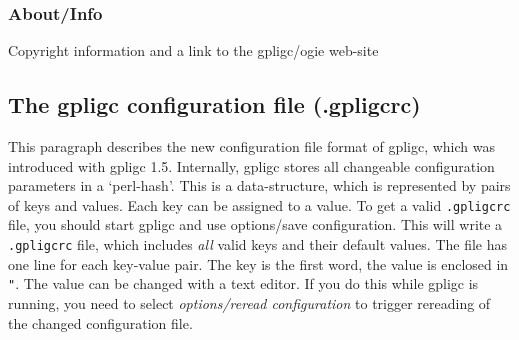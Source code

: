 


\subsubsection{About/Info}
Copyright information and a link to the gpligc/ogie web-site



\subsection{The gpligc configuration file (.gpligcrc)}
This paragraph describes the new configuration file format of gpligc, which was introduced with gpligc 1.5.
Internally, gpligc stores all changeable configuration parameters in a `perl-hash'.
This is a data-structure, which is represented by pairs of keys and values.
Each key can be assigned to a value.
To get a valid \texttt{.gpligcrc} file, you should start gpligc and use options/save configuration.
This will write a \texttt{.gpligcrc} file, which includes \emph{all} valid keys and their default values.
The file has one line for each key-value pair.
The key is the first word, the value is enclosed in \texttt{"}.
The value can be changed with a text editor.
If you do this while gpligc is running, you need to select \emph{options/reread configuration} to trigger rereading of the changed configuration file.

